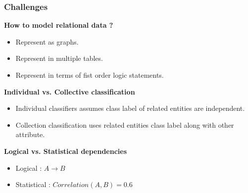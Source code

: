 \documentclass[10pt, blue,subsection=true, compress]{beamer}
\begin{document}
\begin{frame} \frametitle{Challenges}
\begin{block} {\textbf{How to model relational data ?}} 
\begin{itemize}
\item Represent as graphs.
\item Represent in multiple tables.
\item Represent in terms of fist order logic statements.
\end{itemize}
\end{block}

\begin{block}{\textbf{Individual vs. Collective classification}} 
\begin{itemize}
\item Individual classifiers assumes class label of related entities are independent.
\item Collection classification uses related entities class label along with other attribute.
\end{itemize}
\end{block}

\begin{block}{\textbf{Logical vs. Statistical dependencies}}
\begin{itemize}
\item Logical : $A \rightarrow B$
\item Statistical : $Correlation (A,B) = 0.6$
\end{itemize}
\end{block}
\end{frame} 

\end{document}
